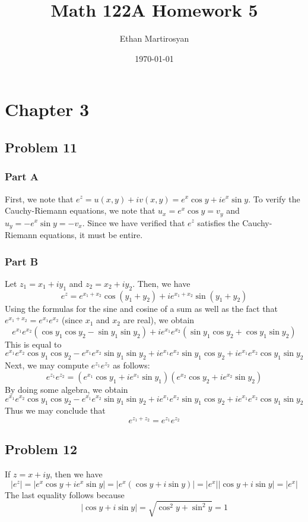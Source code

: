 \documentclass[12pt]{article}
\begin{document}
 
\title{Math 122A Homework 5}
\author{Ethan Martirosyan}
\date{\today}
\maketitle
{}
\hfuzz=50pt
\section*{Chapter 3}
\subsection*{Problem 11}
\subsubsection*{Part A}
First, we note that $e^z = u(x,y) + iv(x,y) = e^x \cos y + i e^x \sin y$. To verify the Cauchy-Riemann equations, we note that $u_x = e^x \cos y = v_y$ and $u_y = -e^x \sin y = - v_x$. Since we have verified that $e^z$ satisfies the Cauchy-Riemann equations, it must be entire.
\subsubsection*{Part B}
Let $z_1 = x_1 + iy_1$ and $z_2 = x_2 + iy_2$. Then, we have 
\[
e^z = e^{x_1+x_2} \cos (y_1 + y_2) + ie^{x_1+x_2}\sin(y_1+y_2)
\] Using the formulas for the sine and cosine of a sum as well as the fact that $e^{x_1+x_2} = e^{x_1}e^{x_2}$ (since $x_1$ and $x_2$ are real), we obtain
\[
e^{x_1}e^{x_2}(\cos y_1 \cos y_2 - \sin y_1 \sin y_2) + i e^{x_1}e^{x_2}(\sin y_1 \cos y_2 + \cos y_1 \sin y_2)
\] This is equal to
\[
e^{x_1}e^{x_2} \cos y_1 \cos y_2 - e^{x_1}e^{x_2} \sin y_1 \sin y_2 + i  e^{x_1}e^{x_2} \sin y_1 \cos y_2 + i e^{x_1}e^{x_2} \cos y_1 \sin y_2
\] Next, we may compute $e^{z_1}e^{z_2}$ as follows:
\[
e^{z_1}e^{z_2} = (e^{x_1}\cos y_1 + i e^{x_1} \sin y_1)(e^{x_2}\cos y_2 + i e^{x_2} \sin y_2) 
\] By doing some algebra, we obtain
\[ 
e^{x_1}e^{x_2} \cos y_1 \cos y_2 - e^{x_1}e^{x_2} \sin y_1 \sin y_2 + i  e^{x_1}e^{x_2} \sin y_1 \cos y_2 + i e^{x_1}e^{x_2} \cos y_1 \sin y_2
\] Thus we may conclude that
\[
e^{z_1+z_2} = e^{z_1}e^{z_2}
\]
\newpage
\subsection*{Problem 12}
If $z=x+iy$, then we have
\[
\vert e^z \vert = \vert e^x \cos y + ie^x \sin y \vert = \vert e^x(\cos y + i \sin y)\vert = \vert e^x \vert \vert \cos y + i \sin y\vert = \vert e^x \vert
\] The last equality follows because 
\[
\vert \cos y + i \sin y \vert = \sqrt{\cos^2 y + \sin^2 y} = 1
\]
\newpage
\end{document}
